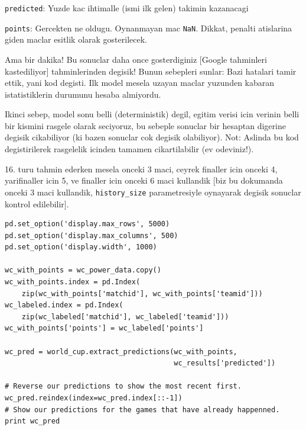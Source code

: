 \documentclass[12pt,fleqn]{article}\usepackage{../common}
\begin{document}
\verb!predicted!: Yuzde kac ihtimalle (ismi ilk gelen) takimin kazanacagi

\verb!points!: Gercekten ne oldugu. Oynanmayan mac \verb!NaN!. Dikkat,
penalti atislarina giden maclar esitlik olarak gosterilecek.

Ama bir dakika! Bu sonuclar daha once gosterdiginiz [Google tahminleri
kastediliyor] tahminlerinden degisik! Bunun sebepleri sunlar: Bazi hatalari
tamir ettik, yani kod degisti. Ilk model mesela uzayan maclar yuzunden
kabaran istatistiklerin durumunu hesaba almiyordu.

Ikinci sebep, model sonu belli (deterministik) degil, egitim verisi icin
verinin belli bir kismini rasgele olarak seciyoruz, bu sebeple sonuclar bir
hesaptan digerine degisik cikabiliyor (ki bazen sonuclar cok degisik
olabiliyor). Not: Aslinda bu kod degistirilerek rasgelelik icinden tamamen
cikartilabilir (ev odeviniz!). 

16. turu tahmin ederken mesela onceki 3 maci, ceyrek finaller icin onceki
4, yarifinaller icin 5, ve finaller icin onceki 6 maci kullandik [biz bu
dokumanda onceki 3 maci kullandik, \verb!history_size! parametresiyle
oynayarak degisik sonuclar kontrol edilebilir].

\begin{verbatim}
pd.set_option('display.max_rows', 5000)
pd.set_option('display.max_columns', 500)
pd.set_option('display.width', 1000)

wc_with_points = wc_power_data.copy()
wc_with_points.index = pd.Index(
    zip(wc_with_points['matchid'], wc_with_points['teamid']))
wc_labeled.index = pd.Index(
    zip(wc_labeled['matchid'], wc_labeled['teamid']))
wc_with_points['points'] = wc_labeled['points']

wc_pred = world_cup.extract_predictions(wc_with_points, 
                                        wc_results['predicted'])

# Reverse our predictions to show the most recent first.
wc_pred.reindex(index=wc_pred.index[::-1])
# Show our predictions for the games that have already happenned.
print wc_pred
\end{verbatim}
\end{document}
